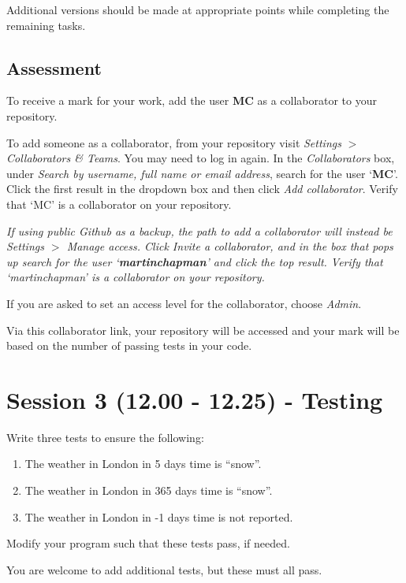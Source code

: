 \documentclass{article}
\begin{document}
Additional versions should be made at appropriate points while completing the remaining tasks.

\subsection{Assessment}

To receive a mark for your work,
add the user \textbf{MC} as a collaborator to your repository.

To add someone as a collaborator, from your repository 
visit \textit{Settings} $>$ \textit{Collaborators \& Teams}. You may
need to log in again. In the \textit{Collaborators} box, under
\textit{Search by username, full name or email address}, search for the
user `\textbf{MC}'. Click the first result in the dropdown box and then
click \textit{Add collaborator}. Verify that `MC' is a collaborator on
your repository.

\textit{If using public Github as a backup, the path to add a collaborator will instead be \textit{Settings} $>$
\textit{Manage access}. Click \textit{Invite a collaborator}, and 
in the box that pops up search for the user `\textbf{martinchapman}' and click the top result. Verify that `martinchapman' is a collaborator on your repository.}

If you are asked to set an access level for the collaborator, choose \textit{Admin}.

Via this collaborator link, your repository will be accessed and 
your mark will be based on the number of passing tests
in your code.

\section{Session 3 (12.00 - 12.25) - Testing}

Write three tests to ensure the following:

\begin{enumerate}
    \item The weather in London in 5 days time is ``snow''.
    \item The weather in London in 365 days time is ``snow''.
    \item The weather in London in -1 days time is not reported.
\end{enumerate}

Modify your program such that these tests pass, if needed.

You are welcome to add additional tests, but these must all pass.
\end{document}
